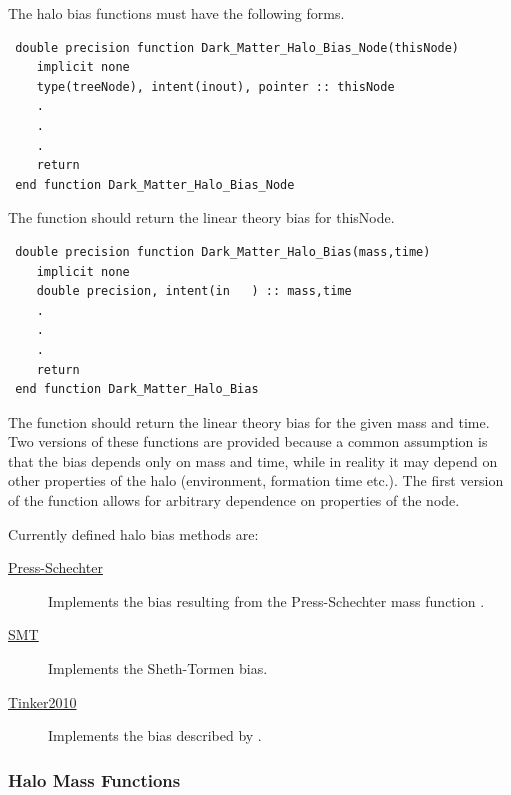 The halo bias functions must have the following forms.
\begin{verbatim}
 double precision function Dark_Matter_Halo_Bias_Node(thisNode)
    implicit none
    type(treeNode), intent(inout), pointer :: thisNode
    .
    .
    .
    return
 end function Dark_Matter_Halo_Bias_Node
\end{verbatim}
The function should return the linear theory bias for {\normalfont \ttfamily thisNode}.
\begin{verbatim}
 double precision function Dark_Matter_Halo_Bias(mass,time)
    implicit none
    double precision, intent(in   ) :: mass,time
    .
    .
    .
    return
 end function Dark_Matter_Halo_Bias
\end{verbatim}
The function should return the linear theory bias for the given {\normalfont \ttfamily mass} and {\normalfont \ttfamily time}. Two versions of these functions are provided because a common assumption is that the bias depends only on mass and time, while in reality it may depend on other properties of the halo (environment, formation time etc.). The first version of the function allows for arbitrary dependence on properties of the node.

Currently defined halo bias methods are:
\begin{description}
 \item [\hyperlink{structure_formation.halo_bias.Press-Schechter.F90:dark_matter_halo_biases_press_schechter:dark_matter_halo_bias_press_schechter}{{\normalfont \ttfamily Press-Schechter}}] Implements the bias resulting from the Press-Schechter \citep{press_formation_1974} mass function \citep{mo_analytic_1996}.
 \item [\hyperlink{structure_formation.halo_bias.SMT.F90:dark_matter_halo_biases_smt:dark_matter_halo_bias_smt}{{\normalfont \ttfamily SMT}}] Implements the Sheth-Tormen \citep{sheth_ellipsoidal_2001} bias.
 \item [\hyperlink{structure_formation.halo_bias.Tinker2010.F90:dark_matter_halo_biases_tinker2010:dark_matter_halo_bias_tinker2010}{{\normalfont \ttfamily Tinker2010}}] Implements the bias described by \cite{tinker_large_2010}.
\end{description}

\subsubsection{Halo Mass Functions}


